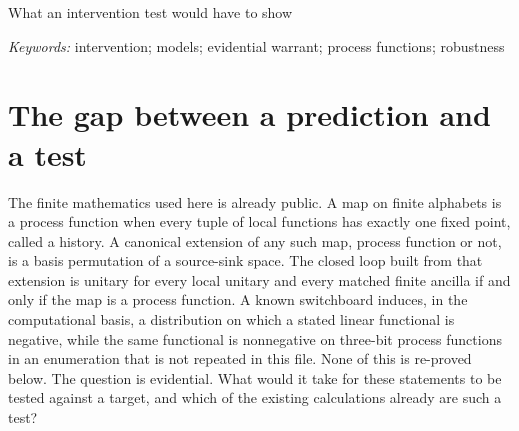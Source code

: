 \documentclass[11pt]{article}
\begin{document}
\begin{center}
{\Large What an intervention test would have to show\par}
\vspace{0.7em}
\end{center}

\begin{abstract}
A process-function model predicts that every replacement of the local maps has exactly one history, and a companion theorem says that the same condition is necessary and sufficient for a canonical closed loop to stay unitary under local unitaries and matched finite ancillas. Those statements fix the pattern an intervention test of the model would have to recover, if a local map has been identified with a manipulation and a history with a record. They are not themselves the test. Evidential warrant for the model as a description of a target would be a match, under those identifications, between the predicted pattern and the records. Calculations internal to the model, including a negative value of a linear functional on a known board in one basis, check consequences of definitions. They do not supply the identifications, and they do not confirm or refute a claim about a device. A finite search shows that an explicit table can be checked. It is a precondition for using the table in a test, not a substitute for one. The mathematics is an alternative adaptation of results already public. No new theorem is offered, and no target is claimed to have been tested.
\end{abstract}

\noindent\textit{Keywords:} intervention; models; evidential warrant; process functions; robustness

\section{The gap between a prediction and a test}
\label{sec:gap}

The finite mathematics used here is already public. A map on finite alphabets is a process function when every tuple of local functions has exactly one fixed point, called a history. A canonical extension of any such map, process function or not, is a basis permutation of a source-sink space. The closed loop built from that extension is unitary for every local unitary and every matched finite ancilla if and only if the map is a process function. A known switchboard induces, in the computational basis, a distribution on which a stated linear functional is negative, while the same functional is nonnegative on three-bit process functions in an enumeration that is not repeated in this file. None of this is re-proved below. The question is evidential. What would it take for these statements to be tested against a target, and which of the existing calculations already are such a test?
\end{document}
